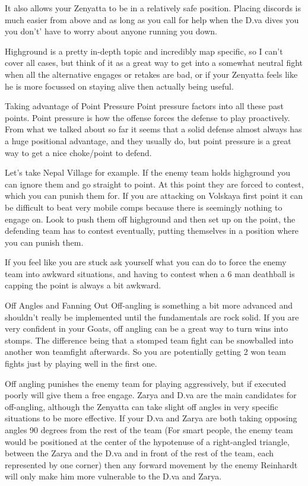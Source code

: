 It also allows your Zenyatta to be in a relatively safe position. Placing discords is much easier from above and as long as you call for help when the D.va dives you you don't’ have to worry about anyone running you down.

Highground is a pretty in-depth topic and incredibly map specific, so I can’t cover all cases, but think of it as a great way to get into a somewhat neutral fight when all the alternative engages or retakes are bad, or if your Zenyatta feels like he is more focussed on staying alive then actually being useful. 

Taking advantage of Point Pressure
Point pressure factors into all these past points. Point pressure is how the offense forces the defense to play proactively. From what we talked about so far it seems that a solid defense almost always has a huge positional advantage, and they usually do, but point pressure is a great way to get a nice choke/point to defend. 

Let’s take Nepal Village for example. If the enemy team holds highground you can ignore them and go straight to point. At this point they are forced to contest, which you can punish them for. If you are attacking on Volskaya first point it can be difficult to beat very mobile comps because there is seemingly nothing to engage on. Look to push them off highground and then set up on the point, the defending team has to contest eventually, putting themselves in a position where you can punish them.

If you feel like you are stuck ask yourself what you can do to force the enemy team into awkward situations, and having to contest when a 6 man deathball is capping the point is always a bit awkward.



Off Angles and Fanning Out
Off-angling is something a bit more advanced and shouldn’t really be implemented until the fundamentals are rock solid. If you are very confident in your Goats, off angling can be a great way to turn wins into stomps. The difference being that a stomped team fight can be snowballed into another won teamfight afterwards. So you are potentially getting 2 won team fights just by playing well in the first one.

Off angling punishes the enemy team for playing aggressively, but if executed poorly will give them a free engage. Zarya and D.va are the main candidates for off-angling, although the Zenyatta can take slight off angles in very specific situations to be more effective.  If your D.va and Zarya are both taking opposing angles 90 degrees from the rest of the team (For smart people, the enemy team would be positioned at the center of the hypotenuse of a right-angled triangle, between the Zarya and the D.va and in front of the rest of the team, each represented by one corner) then any forward movement by the enemy Reinhardt will only make him more vulnerable to the D.va and Zarya.

